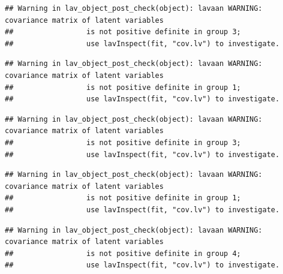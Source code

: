 \documentclass[
  man]{apa6}
\begin{document}
\begin{verbatim}
## Warning in lav_object_post_check(object): lavaan WARNING: covariance matrix of latent variables
##                 is not positive definite in group 3;
##                 use lavInspect(fit, "cov.lv") to investigate.
\end{verbatim}

\begin{verbatim}
## Warning in lav_object_post_check(object): lavaan WARNING: covariance matrix of latent variables
##                 is not positive definite in group 1;
##                 use lavInspect(fit, "cov.lv") to investigate.
\end{verbatim}

\begin{verbatim}
## Warning in lav_object_post_check(object): lavaan WARNING: covariance matrix of latent variables
##                 is not positive definite in group 3;
##                 use lavInspect(fit, "cov.lv") to investigate.
\end{verbatim}

\begin{verbatim}
## Warning in lav_object_post_check(object): lavaan WARNING: covariance matrix of latent variables
##                 is not positive definite in group 1;
##                 use lavInspect(fit, "cov.lv") to investigate.
\end{verbatim}

\begin{verbatim}
## Warning in lav_object_post_check(object): lavaan WARNING: covariance matrix of latent variables
##                 is not positive definite in group 4;
##                 use lavInspect(fit, "cov.lv") to investigate.
\end{verbatim}
\end{document}
